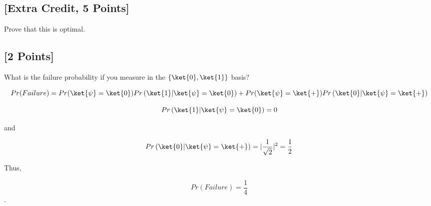 \documentclass[11pt]{article}
\begin{document}
\subsection{[Extra Credit, 5 Points]} Prove that this is optimal.


\subsection{[2 Points]} What is the failure probability if you measure in the $\{\ket{0}, \ket{1}\}$ basis?
\begin{solution}
    \[Pr(Failure) = Pr(\ket{\psi} = \ket{0}) Pr\left(\ket{1} | \ket{\psi} = \ket{0}\right) + Pr(\ket{\psi} = \ket{+}) Pr\left(\ket{0} | \ket{\psi} = \ket{+}\right) \]

    \[Pr\left(\ket{1} | \ket{\psi} = \ket{0}\right) = 0\]

    and 

    \[Pr\left(\ket{0} | \ket{\psi} = \ket{+}\right) = |\frac{1}{\sqrt{2}}|^2 = \frac{1}{2}\]

    Thus, 

    \[Pr(Failure) = \frac{1}{4}\]. 
\end{solution}
\end{document}
